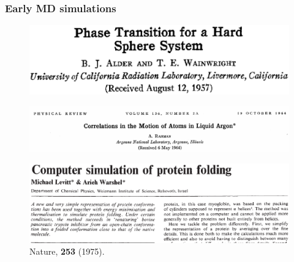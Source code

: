 \documentclass{beamer}
\begin{document}
\begin{frame}\frametitle{Early MD simulations}

\begin{minipage}[t]{0.4\linewidth}

\begin{figure}
\includegraphics[scale=0.16]{hard_spheres.eps}
\end{figure}

\end{minipage}
\hfill%
\begin{minipage}[t]{0.58\linewidth}
\begin{figure}
\includegraphics[scale=0.21]{rahman_1964.eps}
\end{figure}
\end{minipage}

\begin{figure}
\includegraphics[scale=0.19]{levitt_1975.eps}
\caption{{\scriptsize Nature, {\bf 253} (1975).}}
\end{figure}

\end{frame}
\end{document}
